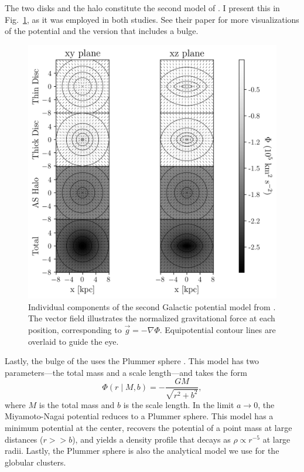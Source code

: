         The two disks and the halo constitute the second model of \citet{2017A&A...598A..66P}. I present this in Fig.~\ref{fig:figure_pouliasis2017pii_potential}, as it was employed in both studies. See their paper for more visualizations of the potential and the version that includes a bulge.
        \begin{figure}
            \centering
            \includegraphics[width=\linewidth]{images/figure_pouliasis2017pii_potential_-8_8.png}
            \caption{Individual components of the second Galactic potential model from \citet{2017A&A...598A..66P}. The vector field illustrates the normalized gravitational force at each position, corresponding to $\vec{g} = -\nabla\Phi$. Equipotential contour lines are overlaid to guide the eye.}
            \label{fig:figure_pouliasis2017pii_potential}
        \end{figure}
        Lastly, the bulge of the \citet{2017A&A...598A..66P} uses the Plummer sphere \citep{1911MNRAS..71..460P}. This model has two parameters—the total mass and a scale length—and takes the form
        \begin{equation} \label{eq:plummer}
            \Phi(r \mid M, b) = -\frac{G M}{\sqrt{r^2 + b^2}},
        \end{equation}
        where $M$ is the total mass and $b$ is the scale length. In the limit $a \rightarrow 0$, the Miyamoto-Nagai potential reduces to a Plummer sphere. This model has a minimum potential at the center, recovers the potential of a point mass at large distances ($r >> b$), and yields a density profile that decays as $\rho \propto r^{-5}$ at large radii. Lastly, the Plummer sphere is also the analytical model we use for the globular clusters.

